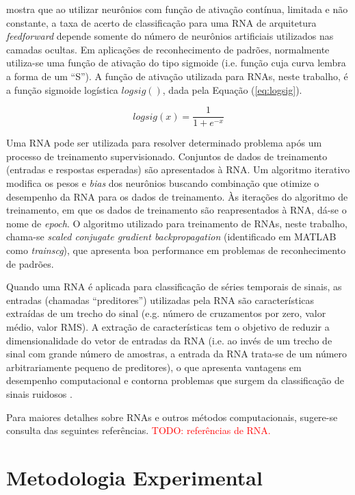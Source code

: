 \cite{Hornik1991} mostra que ao utilizar neurônios com função de ativação contínua, limitada e não constante, a taxa de acerto de classificação para uma RNA de arquitetura \emph{feedforward} depende somente do número de neurônios artificiais utilizados nas camadas ocultas. Em aplicações de reconhecimento de padrões, normalmente utiliza-se uma função de ativação do tipo sigmoide (i.e. função cuja curva lembra a forma de um ``S'').  A função de ativação utilizada para RNAs, neste trabalho, é a função sigmoide logística $logsig()$, dada pela Equação (\ref{eq:logsig}).

\begin{equation}
\label{eq:logsig}
	logsig(x) = \frac{1}{1+e^{-x}}
\end{equation}

Uma RNA pode ser utilizada para resolver determinado problema após um processo de treinamento supervisionado. Conjuntos de dados de treinamento (entradas e respostas esperadas) são apresentados à RNA. Um algoritmo iterativo modifica os pesos e \emph{bias} dos neurônios buscando combinação que otimize o desempenho da RNA para os dados de treinamento. Às iterações do algoritmo de treinamento, em que os dados de treinamento são reapresentados à RNA, dá-se o nome de \emph{epoch}. O algoritmo utilizado para treinamento de RNAs, neste trabalho, chama-se \emph{scaled conjugate gradient backpropagation} \cite{Moller1993} (identificado em MATLAB como \emph{trainscg}), que apresenta boa performance em problemas de reconhecimento de padrões.

Quando uma RNA é aplicada para classificação de séries temporais de sinais, as entradas (chamadas ``preditores'') utilizadas pela RNA são características extraídas de um trecho do sinal (e.g. número de cruzamentos por zero, valor médio, valor RMS). A extração de características tem o objetivo de reduzir a dimensionalidade do vetor de entradas da RNA (i.e. ao invés de um trecho de sinal com grande número de amostras, a entrada da RNA trata-se de um número arbitrariamente pequeno de preditores), o que apresenta vantagens em desempenho computacional e contorna problemas que surgem da classificação de sinais ruidosos \cite{Kim2000}.

Para maiores detalhes sobre RNAs e outros métodos computacionais, sugere-se consulta das seguintes referências. \textcolor{red}{TODO: referências de RNA.}


	\chapter{Metodologia Experimental}

